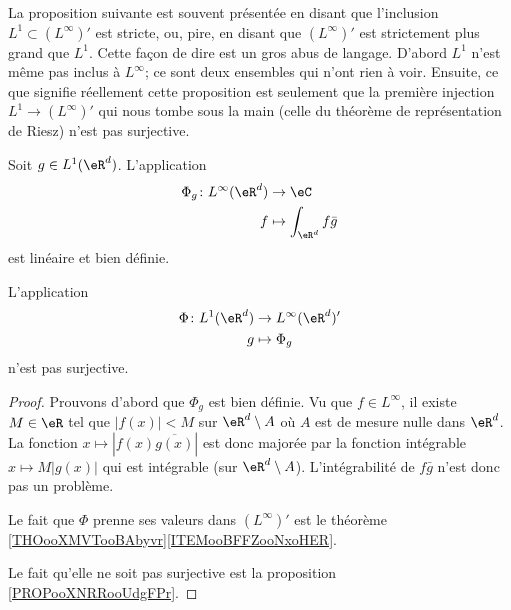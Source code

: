 La proposition suivante est souvent présentée en disant que l'inclusion \( L^1\subset (L^{\infty})'\) est stricte, ou, pire, en disant que \( (L^{\infty})'\) est strictement plus grand que \( L^1\). Cette façon de dire est un gros abus de langage. D'abord \( L^1\) n'est même pas inclus à \( L^{\infty}\); ce sont deux ensembles qui n'ont rien à voir. Ensuite, ce que signifie réellement cette proposition est seulement que la première injection \( L^1\to (L^{\infty})'\) qui nous tombe sous la main (celle du théorème de représentation de Riesz) n'est pas surjective.
\begin{proposition}     \label{PROPooXXRQooNSBZOi}
	Soit \( g\in L^1(\eR^d)\). L'application
	\begin{equation}
		\begin{aligned}
			\Phi_g\colon L^{\infty}(\eR^d) & \to \eC                     \\
			f                              & \mapsto \int_{\eR^d}f\bar g
		\end{aligned}
	\end{equation}
	est linéaire et bien définie.

	L'application
	\begin{equation}
		\begin{aligned}
			\Phi\colon L^1(\eR^d) & \to L^{\infty}(\eR^d)' \\
			g                     & \mapsto \Phi_g
		\end{aligned}
	\end{equation}
	n'est pas surjective.
\end{proposition}

\begin{proof}
	Prouvons d'abord que \( \Phi_g\) est bien définie. Vu que \( f\in L^{\infty}\), il existe \( M\in \eR\) tel que \( | f(x) |<M\) sur \( \eR^d\setminus A\) où \( A\) est de mesure nulle dans \( \eR^d\). La fonction \( x\mapsto| f(x)\overline{ g(x) } |\) est donc majorée par la fonction intégrable \( x\mapsto M| g(x) |\) qui est intégrable (sur \( \eR^d\setminus A\)). L'intégrabilité de \( f\bar g\) n'est donc pas un problème.

	Le fait que \( \Phi\) prenne ses valeurs dans \( (L^{\infty})'\) est le théorème \ref{THOooXMVTooBAbyvr}\ref{ITEMooBFFZooNxoHER}.

	Le fait qu'elle ne soit pas surjective est la proposition \ref{PROPooXNRRooUdgFPr}.
\end{proof}
